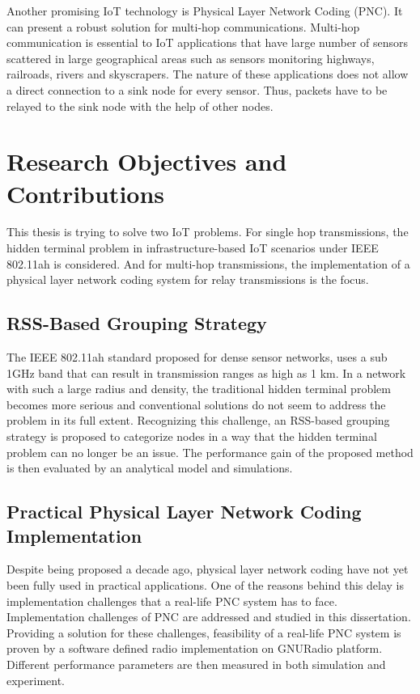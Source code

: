Another promising IoT technology is Physical Layer Network Coding (PNC). It can present a robust solution for multi-hop communications. Multi-hop communication is essential to IoT applications that have large number of sensors scattered in large geographical areas such as sensors monitoring highways, railroads, rivers and skyscrapers. The nature of these applications does not allow a direct connection to a sink node for every sensor. Thus, packets have to be relayed to the sink node with the help of other nodes. 


\section{Research Objectives and Contributions}
This thesis is trying to solve two IoT problems. For single hop transmissions, the hidden terminal problem in infrastructure-based IoT scenarios under IEEE 802.11ah is considered. And for multi-hop transmissions, the implementation of a physical layer network coding system for relay transmissions is the focus.

\subsection{RSS-Based Grouping Strategy}
The IEEE 802.11ah standard proposed for dense sensor networks, uses a sub 1GHz band that can result in transmission ranges as high as 1 km. In a network with such a large radius and density, the traditional hidden terminal problem becomes more serious and conventional solutions do not seem to address the problem in its full extent. Recognizing this challenge, an RSS-based grouping strategy is proposed to categorize nodes in a way that the hidden terminal problem can no longer be an issue. The performance gain of the proposed method is then evaluated by an analytical model and simulations.


\subsection{Practical Physical Layer Network Coding Implementation}
Despite being proposed a decade ago, physical layer network coding have not yet been fully used in practical applications. One of the reasons behind this delay is implementation challenges that a real-life PNC system has to face. Implementation challenges of PNC are addressed and studied in this dissertation. Providing a solution for these challenges, feasibility of a real-life PNC system is proven by a software defined radio implementation on GNURadio platform. Different performance parameters are then measured in both simulation and experiment. 


